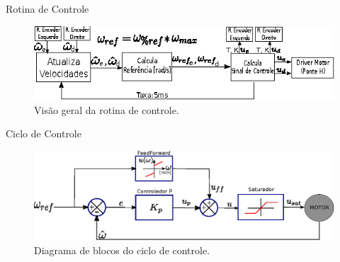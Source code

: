 
\begin{frame}{Rotina de Controle}
    
    \begin{figure}
        \centering
        \includegraphics[width=\textwidth]{figuras/ilustracoes/rotina_controle.eps}
        \caption{Visão geral da rotina de controle.}
    \end{figure}
    
\end{frame}

\begin{frame}{Ciclo de Controle}

    \begin{figure}
        \centering
        \includegraphics[width=\textwidth]{figuras/ilustracoes/sistema_de_controle_completo.eps}
        \caption{Diagrama de blocos do ciclo de controle.}
    \end{figure}
    
\end{frame}
